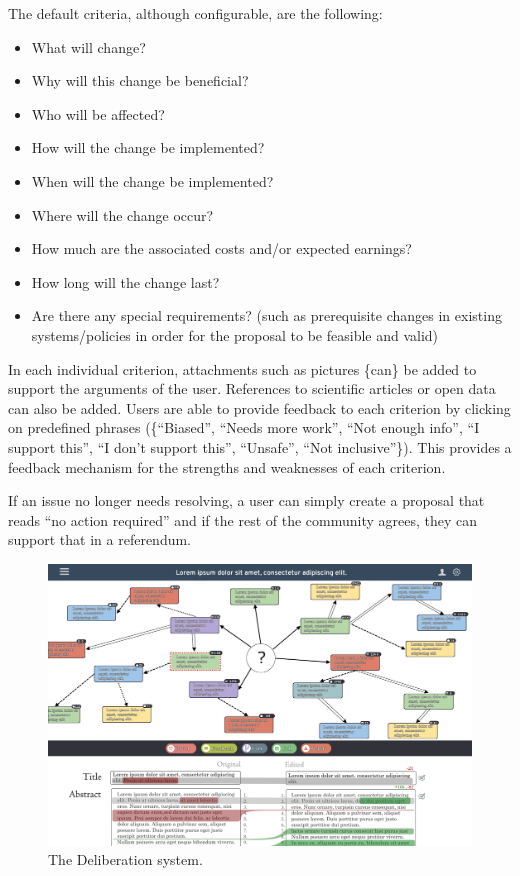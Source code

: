 \documentclass[a4paper,11pt]{article}
\begin{document}
\begin{multicols}{2}
The default criteria, although configurable, are the following:

\begin{itemize}
\item What will change?
\item Why will this change be beneficial?
\item Who will be affected?
\item How will the change be implemented?
\item When will the change be implemented?
\item Where will the change occur?
\item How much are the associated costs and/or expected earnings?
\item How long will the change last?
\item Are there any special requirements? (such as prerequisite changes in existing systems/policies in order for the proposal to be feasible and valid)
\end{itemize}

In each individual criterion, attachments such as pictures \{can\} be added to support the arguments of the user. References to scientific articles or open data can also be added. Users are able to provide feedback to each criterion by clicking on predefined phrases (\{“Biased”, “Needs more work”, “Not enough info”, “I support this”, “I don't support this”, “Unsafe”, “Not inclusive”\}). This provides a feedback mechanism for the strengths and weaknesses of each criterion.

If an issue no longer needs resolving, a user can simply create a proposal that reads “no action required” and if the rest of the community agrees, they can support that in a referendum.

\begin{figure}
 \center
 \includegraphics[width=170mm]{FigureB.jpg}
 \caption{The Deliberation system.}
 \label{figure2}
\end{figure}


\end{multicols}
\end{document}
